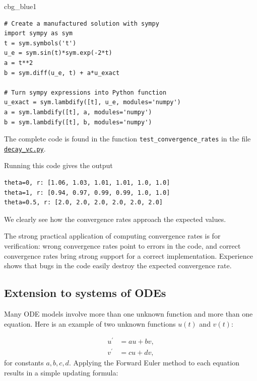 \documentclass[%
oneside,                 %
final,                   %
10pt]{article}
\newenvironment{_cod_tight}[1]{
   \def\FrameCommand{\colorbox{#1}}
   \FrameRule0.6pt\MakeFramed {\FrameRestore}\vskip3mm}
   {\vskip0mm\endMakeFramed}
\newenvironment{cod}[1]{
\bgroup\rmfamily
\fboxsep=0mm\relax
\begin{_cod_tight}{#1}
\list{}{\parsep=-2mm\parskip=0mm\topsep=0pt\leftmargin=2mm
\rightmargin=2\leftmargin\leftmargin=4pt\relax}
\item\relax}
{\endlist\end{_cod_tight}\egroup}
\newenvironment{notice_mdfboxadmon}[1][]{
\begin{notice_mdfboxmdframed}[frametitle=#1]
}
{
\end{notice_mdfboxmdframed}
}
\begin{document}
\begin{cod}{cbg_blue1}\begin{Verbatim}[numbers=none,fontsize=\fontsize{9pt}{9pt},baselinestretch=0.95,xleftmargin=2mm]
# Create a manufactured solution with sympy
import sympy as sym
t = sym.symbols('t')
u_e = sym.sin(t)*sym.exp(-2*t)
a = t**2
b = sym.diff(u_e, t) + a*u_exact

# Turn sympy expressions into Python function
u_exact = sym.lambdify([t], u_e, modules='numpy')
a = sym.lambdify([t], a, modules='numpy')
b = sym.lambdify([t], b, modules='numpy')
\end{Verbatim}
\end{cod}
\noindent
The complete code is found in the function \Verb!test_convergence_rates!
in the file \href{{http://tinyurl.com/ofkw6kc/genz/decay_vc.py}}{\nolinkurl{decay_vc.py}}.

Running this code gives the output

\begin{Verbatim}[frame=lines,label=\fbox{{\tiny Terminal}},framesep=2.5mm,framerule=0.7pt,fontsize=\fontsize{9pt}{9pt}]
theta=0, r: [1.06, 1.03, 1.01, 1.01, 1.0, 1.0]
theta=1, r: [0.94, 0.97, 0.99, 0.99, 1.0, 1.0]
theta=0.5, r: [2.0, 2.0, 2.0, 2.0, 2.0, 2.0]
\end{Verbatim}
We clearly see how the convergence rates approach the expected values.



\begin{notice_mdfboxadmon}
The strong practical application of computing convergence rates is for
verification: wrong convergence rates point to errors in the code, and
correct convergence rates bring strong support for a correct implementation.
Experience shows that bugs in the code easily destroy the
expected convergence rate.
\end{notice_mdfboxadmon}





\subsection{Extension to systems of ODEs}

Many ODE models involve more than one unknown function and more
than one equation. Here is an example of two unknown functions $u(t)$
and $v(t)$:

\begin{align}
u^{\prime} &= a u + bv,\\ 
v^{\prime} &= cu +  dv,
\end{align}
for constants $a,b,c,d$.
Applying the Forward Euler method to each equation results in a simple
updating formula:
\end{document}
